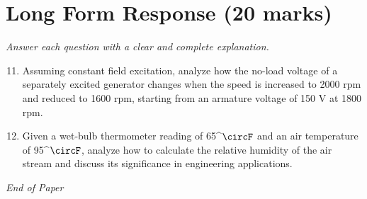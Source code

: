 \documentclass[12pt]{article}
\begin{document}
\section*{Long Form Response (20 marks)}
\textit{Answer each question with a clear and complete explanation.}
\begin{enumerate}[label=\arabic*.]
\setcounter{enumi}{10}
\item Assuming constant field excitation, analyze how the no-load voltage of a separately excited generator changes when the speed is increased to 2000 rpm and reduced to 1600 rpm, starting from an armature voltage of 150 V at 1800 rpm.
\item Given a wet-bulb thermometer reading of 65^\ensuremath{\circF} and an air temperature of 95^\ensuremath{\circF}, analyze how to calculate the relative humidity of the air stream and discuss its significance in engineering applications.
\end{enumerate}

\vfill
\noindent\textit{End of Paper}
\end{document}
